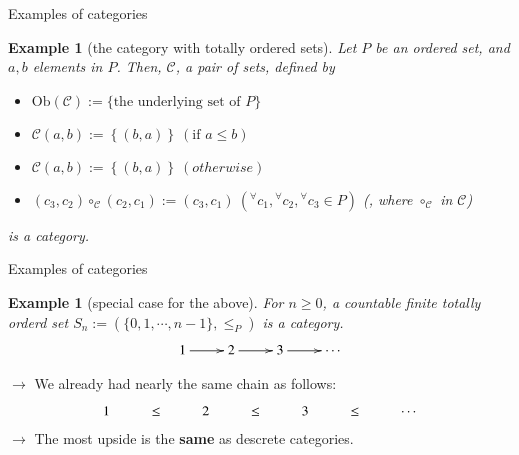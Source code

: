 \documentclass[dvipdfmx,10pt,notheorems]{beamer}
\newtheorem{example}[theorem]{Example}
\renewcommand{\#}{^\sharp}
\begin{document}
	\begin{frame}{Examples of categories}
			\begin{example}[the category with totally ordered sets]
					Let $P$ be an ordered set, and $a,b$ elements in $P$. Then,
					$\mathcal{C}$, a pair of sets, defined by
							\begin{itemize}
									\item $\mathrm{Ob}(\mathcal{C}):=\{\mbox{the underlying set of }P\}$
									\item $\mathcal{C}(a,b):=\left\{(b,a)\right\}~(\mbox{if }a\leq b)$
									\item $\mathcal{C}(a,b):=\left\{(b,a)\right\}~(otherwise)$
									\item $(c_3,c_2)\circ_{\mathcal{C}}(c_2,c_1):=(c_3,c_1)~
									({}^\forall c_1,{}^\forall c_2, {}^\forall c_3\in P)$
									(, where $\circ_\mathcal{C}$ in $\mathcal{C}$)
							\end{itemize}
					is a category.
			\end{example}
	\end{frame}
	
	
	
	\begin{frame}{Examples of categories}
			\begin{example}[special case for the above]
					For $n\geq 0$, a countable finite totally orderd set $S_{n}:=(\{0,1,\cdots, n-1\},\leq_P)$ is a category.
							$$
												\xymatrix{
														1			
														\ar[r]^{}
														&
														2
														\ar[r]^{}
														&
														3
														\ar[r]^{}
														&
														\cdots
												}
							$$
			\end{example}
			$\rightarrow$ We already had nearly the same chain as follows:
							$$
												\xymatrix{
														1			
														&
														\leq
														&
														2
														&
														\leq
														&
														3
														&
														\leq
														&	
														\cdots
												}
							$$
			$\rightarrow$ The most upside is the {\bf same} as descrete categories.
	\end{frame}
\end{document}
